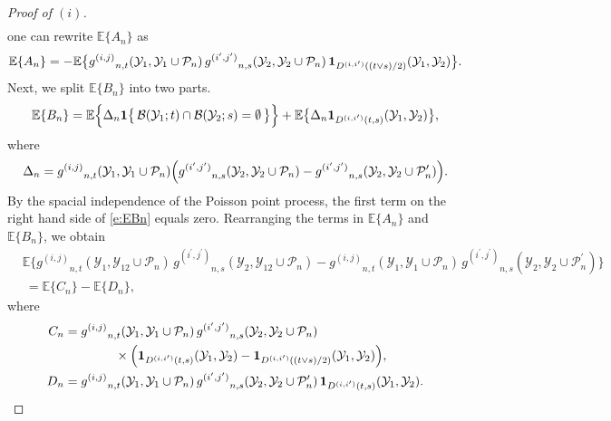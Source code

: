 \documentclass[11pt]{amsart}
\numberwithin{equation}{section}
\theoremstyle{plain}
\theoremstyle{definition}
\begin{document}
\begin{proof}[Proof of $(i)$]
\begin{align*}
\end{align*}
one can rewrite ${\mathbb{E}} \{  A_n\}$ as
$$
{\mathbb{E}} \{ A_n \} = - {\mathbb{E}} \bigl\{ {g^{(i,j)}}_{n,t}({{\mathcal{Y}}}_1, {{\mathcal{Y}}}_1 \cup {\mathcal P_n})\, {g^{(i^{\prime},j^{\prime})}}_{n,s}({{\mathcal{Y}}}_2, {{\mathcal{Y}}}_2 \cup {\mathcal P_n})\, {{\bf 1}}_{{D^{(i,{i^{\prime}})}} ((t\vee s)/2)} ({{\mathcal{Y}}}_1, {{\mathcal{Y}}}_2) \bigr\}.
$$
Next, we split ${\mathbb{E}} \{B_n\}$ into two parts.
\begin{equation}  \label{e:EBn}
{\mathbb{E}} \{B_n\} = {\mathbb{E}} \Bigl\{\Delta_n {{\bf 1}} \bigl\{ \, {\mathcal B} ({{\mathcal{Y}}}_1; t) \cap {\mathcal B} ({{\mathcal{Y}}}_2; s) =\emptyset \, \bigr\} \Bigr\} + {\mathbb{E}} \bigl\{ \Delta_n {{\bf 1}}_{{D^{(i,{i^{\prime}})}} (t,s)} ({{\mathcal{Y}}}_1, {{\mathcal{Y}}}_2)\bigr\},
\end{equation}
where
$$
\Delta_n = {g^{(i,j)}}_{n,t}({{\mathcal{Y}}}_1, {{\mathcal{Y}}}_1 \cup {\mathcal P_n}) \Bigl( {g^{(i^{\prime},j^{\prime})}}_{n,s}({{\mathcal{Y}}}_2, {{\mathcal{Y}}}_2 \cup {\mathcal P_n}) - {g^{(i^{\prime},j^{\prime})}}_{n,s}({{\mathcal{Y}}}_2, {{\mathcal{Y}}}_2 \cup {\mathcal P_n^{\prime}}) \Bigr).
$$
By the spacial independence of the Poisson point process, the first term on the right hand side of \eqref{e:EBn} equals zero.
Rearranging the terms in ${\mathbb{E}}\{A_n\}$ and ${\mathbb{E}}\{B_n\}$, we obtain
\begin{align*}
&{\mathbb{E}} \bigl\{  {g^{(i,j)}}_{n,t}({{\mathcal{Y}}}_1, {{\mathcal{Y}}}_{12} \cup {\mathcal P_n})\, {g^{(i^{\prime},j^{\prime})}}_{n,s}({{\mathcal{Y}}}_2, {{\mathcal{Y}}}_{12} \cup {\mathcal P_n}) - {g^{(i,j)}}_{n,t}({{\mathcal{Y}}}_1, {{\mathcal{Y}}}_1 \cup {\mathcal P_n})\, {g^{(i^{\prime},j^{\prime})}}_{n,s} ({{\mathcal{Y}}}_2, {{\mathcal{Y}}}_2 \cup {\mathcal P_n^{\prime}}) \bigr\} \\
&\ ={\mathbb{E}}\{C_n\} -{\mathbb{E}}\{D_n\},
\end{align*}
where
\begin{align*}
C_n &= {g^{(i,j)}}_{n,t}({{\mathcal{Y}}}_1, {{\mathcal{Y}}}_1 \cup {\mathcal P_n})\, {g^{(i^{\prime},j^{\prime})}}_{n,s}({{\mathcal{Y}}}_2, {{\mathcal{Y}}}_2 \cup {\mathcal P_n}) \\
&\qquad \qquad \times \Bigl( {{\bf 1}}_{{D^{(i,{i^{\prime}})}}(t,s)} ({{\mathcal{Y}}}_1,{{\mathcal{Y}}}_2) - {{\bf 1}}_{{D^{(i,{i^{\prime}})}}((t\vee s)/2)} ({{\mathcal{Y}}}_1,{{\mathcal{Y}}}_2) \Bigr), \\
D_n &= {g^{(i,j)}}_{n,t}({{\mathcal{Y}}}_1, {{\mathcal{Y}}}_1 \cup {\mathcal P_n})\, {g^{(i^{\prime},j^{\prime})}}_{n,s}({{\mathcal{Y}}}_2, {{\mathcal{Y}}}_2 \cup {\mathcal P_n^{\prime}})\, {{\bf 1}}_{{D^{(i,{i^{\prime}})}}(t,s)} ({{\mathcal{Y}}}_1,{{\mathcal{Y}}}_2).

\end{align*}
\end{proof}
\end{document}
